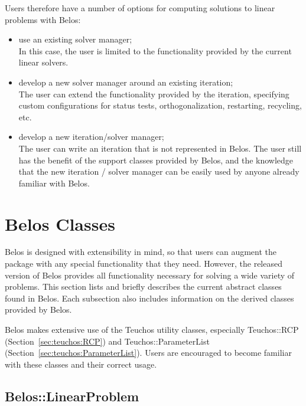 Users therefore have a number of options for computing solutions to linear problems with Belos:
\begin{itemize}
  \item use an existing solver manager;\\
        In this case, the user is limited to the functionality provided by the current linear solvers.
  \item develop a new solver manager around an existing iteration;\\
        The user can extend the functionality provided by the iteration, specifying 
        custom configurations for status tests, orthogonalization, restarting, recycling,
        etc.
  \item develop a new iteration/solver manager;\\
        The user can write an iteration that is not represented in
        Belos. The user still has the benefit of the support classes provided by 
        Belos, and the knowledge that the new iteration / solver manager can be easily
        used by anyone already familiar with Belos.
\end{itemize}


\section{Belos Classes}
\label{sec:belos:classes}

Belos is designed with extensibility in mind, so that users can augment the package with
any special functionality that they need. However, the released version of Belos
provides all functionality necessary for solving a wide variety of problems. This section
lists and briefly describes the current abstract classes found in Belos.  Each subsection 
also includes information on the derived classes provided by Belos.

\begin{remark}
Belos makes extensive use of the Teuchos utility classes, especially
Teuchos::RCP (Section~\ref{sec:teuchos:RCP}) and
Teuchos::ParameterList (Section~\ref{sec:teuchos:ParameterList}). Users
are encouraged to become familiar with these classes and their correct
usage.
\end{remark}

\subsection{Belos::LinearProblem}
\label{sec:belos:linearproblem}

